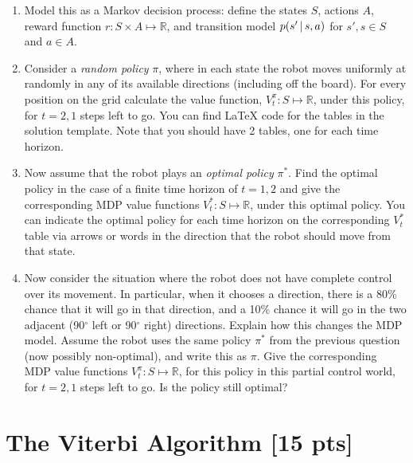 \documentclass[submit]{harvardml}
\begin{document}
\begin{problem}
  \begin{enumerate}
    \item Model this as a Markov decision process: define the states $S$, actions $A$, reward function $r:S\times A\mapsto \mathbb{R}$, and transition model $p(s'\,|\, s, a)$ for $s', s\in S$ and $a\in A$.
%
    \item Consider a \emph{random policy} $\pi$, where
in each state the robot moves uniformly at randomly in any of its available directions (including off the board). 
      For every position on the grid calculate the
value function, $V^\pi_t: S\mapsto 
\mathbb{R}$, under this policy, for $t=2, 1$ steps left
to go. You can find LaTeX code for the tables in the solution template. Note that you should have 2 tables, one for each time horizon. 
%
    \item Now assume that the robot plays an \emph{optimal policy}
      $\pi^\ast$. Find the optimal policy in the case of a finite time horizon of $t = 1, 2$ and give the corresponding 
MDP value functions $V^\ast_t: S\mapsto 
\mathbb{R}$, under this
optimal policy. You can indicate the optimal policy for each time horizon on the corresponding $V^\ast_t$ table via arrows or words in the direction that the robot should move from that state. 
    \item Now consider the situation where the robot does not have
      complete control over its movement. In particular, 
when it chooses a direction, there is a 80\% chance that it will go in
      that direction, and a 10\% chance it will go in the two adjacent
      (90$^\circ$ left or 90$^\circ$ right) 
directions. Explain how this changes the MDP model. 
Assume the robot uses the same
 policy $\pi^*$ from the previous question (now possibly
      non-optimal), and write this as $\pi$.
Give the corresponding 
MDP value functions $V^\pi_t: S\mapsto 
\mathbb{R}$, for this policy in this partial control world, for $t=2, 1$ steps left
to go. Is the policy still optimal?
  \end{enumerate}
\end{problem}
\newpage

\section*{The Viterbi Algorithm [15 pts]}
\end{document}
